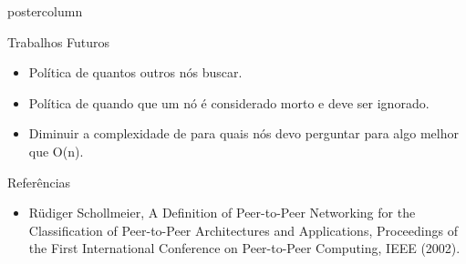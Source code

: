 \documentclass[final]{beamer}
\begin{document}
\begin{frame}
\begin{columns}
\begin{column}{.5\textwidth}
\begin{beamercolorbox}[center,wd=\textwidth]{postercolumn}
\begin{minipage}[T]{.95\textwidth}
{\begin{block}{Trabalhos Futuros}
                \begin{itemize}
                  \item Política de quantos outros nós buscar.
                  \item Política de quando que um nó é considerado morto e deve ser ignorado.
                  \item Diminuir a complexidade de para quais nós devo perguntar para algo melhor que O(n).
                \end{itemize}
                
                \vspace*{0.2cm} 
            \end{block}
            
            \vspace*{0.2cm} 
            
            \begin{block}{Referências}
              \small
                \begin{itemize}
                    \item Rüdiger Schollmeier, A Definition of Peer-to-Peer Networking for the Classification of Peer-to-Peer Architectures and Applications, Proceedings of the First International Conference on Peer-to-Peer Computing, IEEE (2002).
                \end{itemize}
                \vspace*{0.2cm} 
            \end{block}
            \vfill
          }
        \end{minipage}
      \end{beamercolorbox}
    \end{column}


  \end{columns}
\end{frame}
\end{document}
